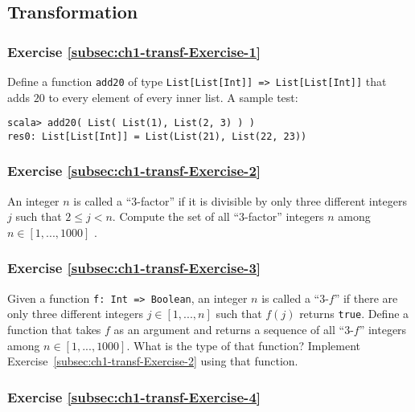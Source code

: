 \subsection{Transformation}

\subsubsection{Exercise \label{subsec:ch1-transf-Exercise-1}\ref{subsec:ch1-transf-Exercise-1}}

Define a function \texttt{}\lstinline!add20! of type \texttt{}\lstinline!List[List[Int]] => List[List[Int]]!
that adds $20$ to every element of every inner list. A sample test:
\begin{lstlisting}
scala> add20( List( List(1), List(2, 3) ) )
res0: List[List[Int]] = List(List(21), List(22, 23))
\end{lstlisting}


\subsubsection{Exercise \label{subsec:ch1-transf-Exercise-2}\ref{subsec:ch1-transf-Exercise-2}}

An integer $n$ is called a \textsf{``}$3$-factor\textsf{''} if it is divisible by
only three different integers $j$ such that $2\leq j<n$. Compute
the set of all \textsf{``}$3$-factor\textsf{''} integers $n$ among $n\in[1,...,1000]$
.

\subsubsection{Exercise \label{subsec:ch1-transf-Exercise-3}\ref{subsec:ch1-transf-Exercise-3}}

Given a function \lstinline!f: Int => Boolean!, an integer $n$ is
called a \textsf{``}$3$-$f$\textsf{''} if there are only three different integers
$j\in[1,...,n]$ such that $f(j)$ returns \lstinline!true!. Define
a function that takes $f$ as an argument and returns a sequence of
all \textsf{``}$3$-$f$\textsf{''} integers among $n\in[1,...,1000]$. What is the
type of that function? Implement Exercise~\ref{subsec:ch1-transf-Exercise-2}
using that function.

\subsubsection{Exercise \label{subsec:ch1-transf-Exercise-4}\ref{subsec:ch1-transf-Exercise-4}}


